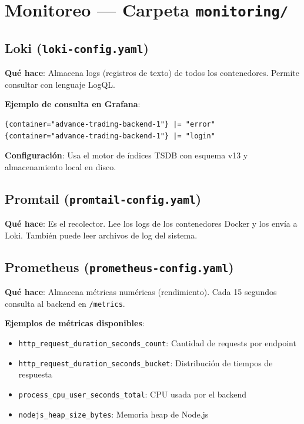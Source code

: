 \documentclass[12pt,oneside]{article}
\begin{document}
\section{Monitoreo — Carpeta \texttt{monitoring/}}

\subsection{Loki (\texttt{loki-config.yaml})}

\textbf{Qué hace}: Almacena logs (registros de texto) de todos los contenedores. Permite consultar con lenguaje LogQL.

\textbf{Ejemplo de consulta en Grafana}:
\begin{lstlisting}
{container="advance-trading-backend-1"} |= "error"
{container="advance-trading-backend-1"} |= "login"
\end{lstlisting}

\textbf{Configuración}: Usa el motor de índices TSDB con esquema v13 y almacenamiento local en disco.

\subsection{Promtail (\texttt{promtail-config.yaml})}

\textbf{Qué hace}: Es el recolector. Lee los logs de los contenedores Docker y los envía a Loki. También puede leer archivos de log del sistema.

\subsection{Prometheus (\texttt{prometheus-config.yaml})}

\textbf{Qué hace}: Almacena métricas numéricas (rendimiento). Cada 15 segundos consulta al backend en \texttt{/metrics}.

\textbf{Ejemplos de métricas disponibles}:
\begin{itemize}
    \item \texttt{http\_request\_duration\_seconds\_count}: Cantidad de requests por endpoint
    \item \texttt{http\_request\_duration\_seconds\_bucket}: Distribución de tiempos de respuesta
    \item \texttt{process\_cpu\_user\_seconds\_total}: CPU usada por el backend
    \item \texttt{nodejs\_heap\_size\_bytes}: Memoria heap de Node.js
\end{itemize}
\end{document}
